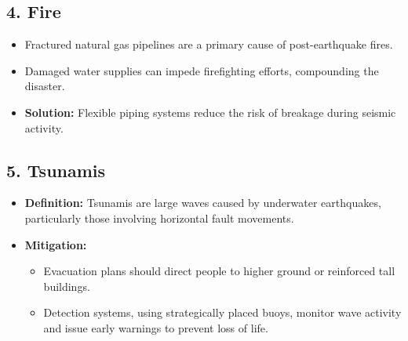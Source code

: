 \documentclass[12pt]{article}
\begin{document}
\subsection*{4. Fire}
\begin{itemize}
    \item Fractured natural gas pipelines are a primary cause of post-earthquake fires.
    \item Damaged water supplies can impede firefighting efforts, compounding the disaster.
    \item \textbf{Solution:} Flexible piping systems reduce the risk of breakage during seismic activity.
\end{itemize}

\subsection*{5. Tsunamis}
\begin{itemize}
    \item \textbf{Definition:} Tsunamis are large waves caused by underwater earthquakes, particularly those involving horizontal fault movements.
    \item \textbf{Mitigation:}
    \begin{itemize}
        \item Evacuation plans should direct people to higher ground or reinforced tall buildings.
        \item Detection systems, using strategically placed buoys, monitor wave activity and issue early warnings to prevent loss of life.
    \end{itemize}
\end{itemize}
\end{document}
